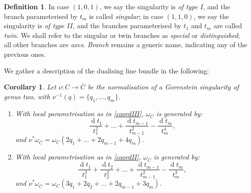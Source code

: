 \documentclass{compositio}
\renewcommand{\k}{\mathbf k}
\renewcommand{\to}{\rightarrow}
\theoremstyle{plain}
\newtheorem{cor}[thm]{Corollary}
\theoremstyle{definition}
\newtheorem{definition}[thm]{Definition}
\theoremstyle{remark}
\begin{document}

\begin{definition}\label{def:special_branches}
 In case $(1,0,1)$, we say the singularity is \emph{of type $I$}, and the branch parameterised by $t_m$ is called \emph{singular}; in case $(1,1,0)$, we say the singularity is \emph{of type $I\!I$}, and the branches parameterised by $t_1$ and $t_m$ are called \emph{twin}. We shall refer to the singular or twin branches as \emph{special} or \emph{distinguished}; all other branches are \emph{axes}. \emph{Branch} remains a generic name, indicating any of the previous ones.
\end{definition}

We gather a description of the dualising line bundle in the following:
\begin{cor}\label{cor:dualising_line_bundle}
 Let $\nu\colon C\to \bar C$ be the normalisation of a Gorenstein singularity of genus two, with $\nu^{-1}(q)=\{q_1,\ldots,q_m\}$.
 \begin{enumerate}[label=(\Roman*)]
 
 \item With local parametrisation as in \eqref{coordIII}, $\omega_{\bar C}$ is generated by: \[\frac{\operatorname{d}t_1}{t_1^2}+\ldots+\frac{\operatorname{d}t_{m-1}}{t_{m-1}^2}-\frac{\operatorname{d}t_m}{t_m^4},\]
 and $\nu^*\omega_{\bar C}=\omega_C(2q_1+\ldots+2q_{m-1}+4q_m)$.

 \item With local parametrisation as in \eqref{coordII}, $\omega_{\bar C}$ is generated by:
  \[\frac{\operatorname{d}t_1}{t_1^3}+\frac{\operatorname{d}t_2}{t_2^2}+\ldots+\frac{\operatorname{d}t_{m-1}}{t_{m-1}^2}-\frac{\operatorname{d}t_m}{t_m^3},\]  
  and $\nu^*\omega_{\bar C}=\omega_C(3q_1+2q_2+\ldots+2q_{m-1}+3q_m)$.
                                                                                                                                  \end{enumerate}
\end{cor}
\end{document}
